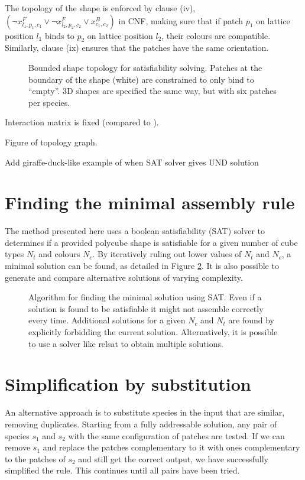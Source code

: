 The topology of the shape is enforced by clause (iv), \(\left(\lnot x_{l_1, p_1, c_1}^{F} \lor \lnot x_{l_2, p_2, c_2}^{F} \lor x_{c_1, c_2}^{B}\right)\) in CNF, making sure that if patch \(p_1\) on lattice position \(l_1\) binds to \(p_2\) on lattice position \(l_2\), their colours are compatible. Similarly, clause (ix) ensures that the patches have the same orientation.

\begin{figure}[h]
    \centering
    \caption{Bounded shape topology for satisfiability solving. Patches at the boundary of the shape (white) are constrained to only bind to ``empty''. 3D shapes are specified the same way, but with six patches per species.}
    \label{fig:sat_boundary}
\end{figure}

Interaction matrix is fixed (compared to \cite{romano2020designing}).

Figure of topology graph.

Add giraffe-duck-like example of when SAT solver gives UND solution

\section{Finding the minimal assembly rule}

The method presented here uses a boolean satisfiability (SAT) solver to determines if a provided polycube shape is satisfiable for a given number of cube types \(N_t\) and colours \(N_c\). By iteratively ruling out lower values of \(N_t\) and \(N_c\), a minimal solution can be found, as detailed in Figure \ref{fig:sat_alg}. It is also possible to generate and compare alternative solutions of varying complexity.

\begin{figure}
    \centering
    \resizebox{\textwidth}{!}{}
    \caption{Algorithm for finding the minimal solution using SAT. Even if a solution is found to be satisfiable it might not assemble correctly every time. Additional solutions for a given \(N_c\) and \(N_t\) are found by explicitly forbidding the current solution. Alternatively, it is possible to use a solver like relsat to obtain multiple solutions. }
    \label{fig:sat_alg}
\end{figure}

\section{Simplification by substitution}
An alternative approach is to substitute species in the input that are similar, removing duplicates. Starting from a fully addressable solution, any pair of species \(s_1\) and \(s_2\) with the same configuration of patches are tested. If we can remove \(s_1\) and replace the patches complementary to it with ones complementary to the patches of \(s_2\) and still get the correct output, we have successfully simplified the rule. This continues until all pairs have been tried.

